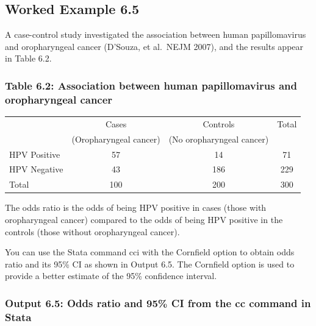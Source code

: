 \documentclass[
]{memoir}
\begin{document}
\hypertarget{worked-example-6.5}{%
\subsection{Worked Example 6.5}\label{worked-example-6.5}}

A case-control study investigated the association between human papillomavirus and oropharyngeal cancer (D'Souza, et al.~NEJM 2007), and the results appear in Table 6.2.

\hypertarget{table-6.2-association-between-human-papillomavirus-and-oropharyngeal-cancer}{%
\subsubsection{Table 6.2: Association between human papillomavirus and oropharyngeal cancer}\label{table-6.2-association-between-human-papillomavirus-and-oropharyngeal-cancer}}

\begin{longtable}[]{@{}lccc@{}}
\toprule
\endhead
& Cases & Controls & Total \\
& (Oropharyngeal cancer) & (No oropharyngeal cancer) & \\
HPV Positive & 57 & 14 & 71 \\
HPV Negative & 43 & 186 & 229 \\
Total & 100 & 200 & 300 \\
\bottomrule
\end{longtable}

The odds ratio is the odds of being HPV positive in cases (those with oropharyngeal cancer) compared to the odds of being HPV positive in the controls (those without oropharyngeal cancer).

You can use the Stata command cci with the Cornfield option to obtain odds ratio and its 95\% CI as shown in Output 6.5. The Cornfield option is used to provide a better estimate of the 95\% confidence interval.

\hypertarget{output-6.5-odds-ratio-and-95-ci-from-the-cc-command-in-stata}{%
\subsubsection{Output 6.5: Odds ratio and 95\% CI from the cc command in Stata}\label{output-6.5-odds-ratio-and-95-ci-from-the-cc-command-in-stata}}
\end{document}
